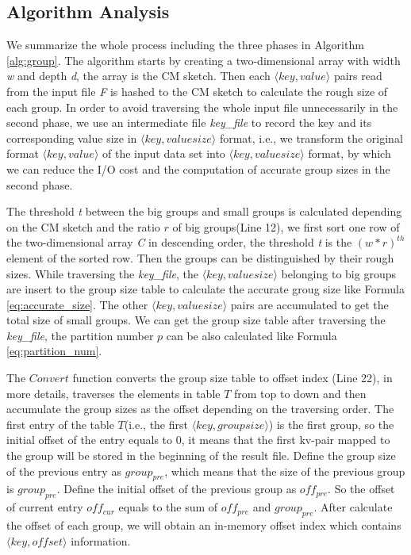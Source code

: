 \subsection{Algorithm Analysis}
We summarize the whole process including the three phases in Algorithm \ref{alg:group}. The algorithm starts by creating a two-dimensional array with width \emph{w} and depth \emph{d}, the array is the CM sketch. Then each $\langle key, value\rangle$ pairs read from the input file \emph{F} is hashed to the CM sketch to calculate the rough size of each group. In order to avoid traversing the whole input file unnecessarily in the second phase, we use an intermediate file \emph{key\_file} to record the key and its corresponding value size in $\langle key, valuesize\rangle$ format, i.e., we transform the original format $\langle key, value\rangle$ of the input data set into $\langle key, valuesize\rangle$ format, by which we can reduce the I/O cost and the computation of accurate group sizes in the second phase.

The threshold \emph{t} between the big groups and small groups is calculated depending on the CM sketch and the ratio $r$ of big groups(Line 12), we first sort one row of the two-dimensional array \emph{C} in descending order, the threshold \emph{t} is the ${(w*r)}^{th}$ element of the sorted row. Then the groups can be distinguished by their rough sizes. While traversing the \emph{key\_file}, the $\langle key, valuesize\rangle$ belonging to big groups are insert to the group size table to calculate the accurate groug size like Formula \ref{eq:accurate_size}. The other $\langle key, valuesize\rangle$ pairs are accumulated to get the total size of small groups. We can get the group size table after traversing the \emph{key\_file}, the partition number $p$ can be also calculated like Formula \ref{eq:partition_num}.

The $Convert$ function converts the group size table to offset index (Line 22), in more details, traverses the elements in table $T$ from top to down and then accumulate the group sizes as the offset depending on the traversing order. The first entry of the table $T$(i.e., the first $\langle key, groupsize\rangle$) is the first group, so the initial offset of the entry equals to 0, it means that the first kv-pair mapped to the group will be stored in the beginning of the result file. Define the group size of the previous entry as $group_{pre}$, which means that the size of the previous group is $group_{pre}$. Define the initial offset of the previous group as ${off}_{pre}$. So the offset of current entry ${off}_{cur}$ equals to the sum of ${off}_{pre}$ and $group_{pre}$. After calculate the offset of each group, we will obtain an in-memory offset index which contains $\langle key,offset\rangle$ information.


